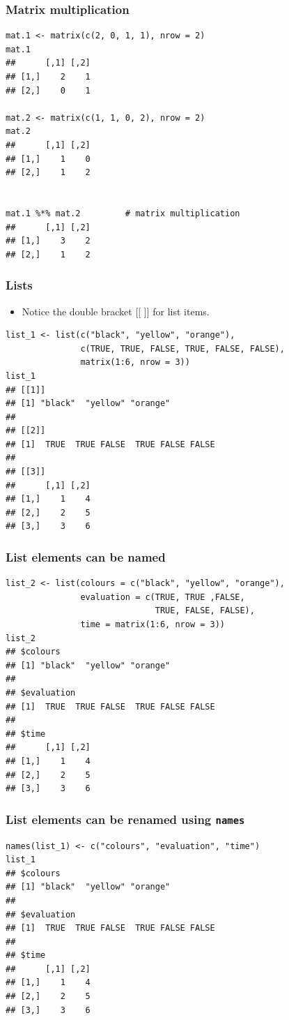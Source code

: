 \documentclass{beamer}
\newcommand{\lst}[1]{\lstinline{#1}}
\newcommand{\bi}{\begin{itemize}}
\newcommand{\li}{\item}
\newcommand{\ei}{\end{itemize}}
\newcommand{\bfr}[1]{\begin{frame}[fragile]\frametitle{{ #1 }}}
\begin{document}
\bfr{Matrix multiplication }
\begin{verbatim}
mat.1 <- matrix(c(2, 0, 1, 1), nrow = 2)  
mat.1                         
##      [,1] [,2]
## [1,]    2    1
## [2,]    0    1

mat.2 <- matrix(c(1, 1, 0, 2), nrow = 2)
mat.2
##      [,1] [,2]
## [1,]    1    0
## [2,]    1    2


mat.1 %*% mat.2         # matrix multiplication
##      [,1] [,2]
## [1,]    3    2
## [2,]    1    2
\end{verbatim}
\end{frame}

\bfr{Lists}
\bi
\li Notice the double bracket [[ ]] for list items.
\ei
\begin{verbatim}
list_1 <- list(c("black", "yellow", "orange"),
               c(TRUE, TRUE, FALSE, TRUE, FALSE, FALSE),
               matrix(1:6, nrow = 3))
list_1
## [[1]]
## [1] "black"  "yellow" "orange"
## 
## [[2]]
## [1]  TRUE  TRUE FALSE  TRUE FALSE FALSE
## 
## [[3]]
##      [,1] [,2]
## [1,]    1    4
## [2,]    2    5
## [3,]    3    6
\end{verbatim}
\end{frame}

\bfr{List elements can be named}
\begin{verbatim}
list_2 <- list(colours = c("black", "yellow", "orange"), 
               evaluation = c(TRUE, TRUE ,FALSE, 
                              TRUE, FALSE, FALSE), 
               time = matrix(1:6, nrow = 3))
list_2
## $colours
## [1] "black"  "yellow" "orange"
## 
## $evaluation
## [1]  TRUE  TRUE FALSE  TRUE FALSE FALSE
## 
## $time
##      [,1] [,2]
## [1,]    1    4
## [2,]    2    5
## [3,]    3    6
\end{verbatim}
\end{frame}

\bfr{List elements can be renamed using \lst{names}}
\begin{verbatim}
names(list_1) <- c("colours", "evaluation", "time")
list_1
## $colours
## [1] "black"  "yellow" "orange"
## 
## $evaluation
## [1]  TRUE  TRUE FALSE  TRUE FALSE FALSE
## 
## $time
##      [,1] [,2]
## [1,]    1    4
## [2,]    2    5
## [3,]    3    6
\end{verbatim}
\end{frame}
\end{document}
